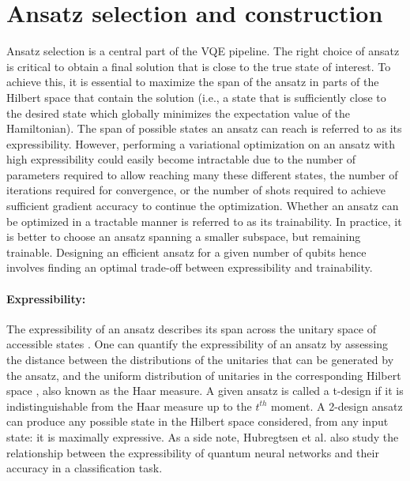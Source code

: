 \section{Ansatz selection and construction}\label{sec:Ansatz}

Ansatz selection is a central part of the VQE pipeline. The right choice of ansatz is critical to obtain a final solution that is close to the true state of interest. To achieve this, it is essential to maximize the span of the ansatz in parts of the Hilbert space that contain the solution (i.e., a state that is sufficiently close to the desired state which globally minimizes the expectation value of the Hamiltonian). The span of possible states an ansatz can reach is referred to as its expressibility. However, performing a variational optimization on an ansatz with high expressibility could easily become intractable due to the number of parameters required to allow reaching many these different states, the number of iterations required for convergence, or the number of shots required to achieve sufficient gradient accuracy to continue the optimization. Whether an ansatz can be optimized in a tractable manner is referred to as its trainability. In practice, it is better to choose an ansatz spanning a smaller subspace, but remaining trainable. Designing an efficient ansatz for a given number of qubits hence involves finding an optimal trade-off between expressibility and trainability.

\paragraph{Expressibility:} The expressibility of an ansatz describes its span across the unitary space of accessible states \cite{Sim2019, Holmes2021, Nakaji2021}.
One can quantify the expressibility of an ansatz by assessing the distance between the distributions of the unitaries that can be generated by the ansatz, and the uniform distribution of unitaries in the corresponding Hilbert space \cite{Sim2019}, also known as the Haar measure. A given ansatz is called a t-design if it is indistinguishable from the Haar measure up to the $t^{th}$ moment. A 2-design ansatz can produce any possible state in the Hilbert space considered, from any input state: it is maximally expressive. As a side note, Hubregtsen et al. \cite{Hubregtsen2021} also study the relationship between the expressibility of quantum neural networks and their accuracy in a classification task. 


